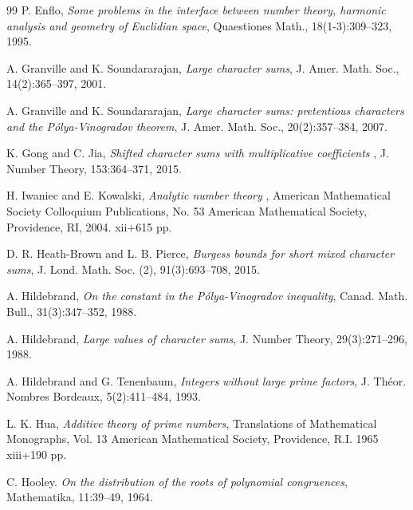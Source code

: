\documentclass[12pt]{amsart}
\begin{document}
\begin{thebibliography}{99}
P. Enflo, {\it Some problems in the interface between number theory, harmonic analysis and geometry of Euclidian space}, Quaestiones Math., 18(1-3):309--323, 1995.

A. Granville and K. Soundararajan,
\textit{Large character sums},
J. Amer. Math. Soc., 14(2):365--397, 2001.
	
A. Granville and K. Soundararajan, {\it Large character sums: pretentious characters and the P\'{o}lya-Vinogradov theorem}, 
 J. Amer. Math. Soc., 20(2):357--384, 2007. 


K. Gong and C. Jia, {\it Shifted character sums with multiplicative coefficients} , J. Number Theory, 153:364--371, 2015.




H. Iwaniec and E. Kowalski, \textit{Analytic number theory }, American Mathematical Society Colloquium Publications, No. 53 American Mathematical Society, Providence, RI, 2004. xii+615 pp.


D. R. Heath-Brown and L. B. Pierce, 
\textit{Burgess bounds for short mixed character sums},
J. Lond. Math. Soc. (2), 91(3):693--708, 2015.

A. Hildebrand,
\textit{On the constant in the {P}\'{o}lya-{V}inogradov inequality},
Canad. Math. Bull., 31(3):347--352, 1988.

A. Hildebrand,
\textit{Large values of character sums},
J. Number Theory, 29(3):271--296, 1988.

A. Hildebrand and G. Tenenbaum, 
\textit{Integers without large prime factors},
J. Théor. Nombres Bordeaux, 5(2):411--484, 1993.

L. K. Hua, 
\textit{Additive theory of prime numbers},
Translations of Mathematical Monographs, Vol. 13 American Mathematical Society, Providence, R.I. 1965 xiii+190 pp.
 
C. Hooley. \textit{On the distribution of the roots of polynomial congruences}, Mathematika, 11:39--49, 1964. 
 

\end{thebibliography}
\end{document}
